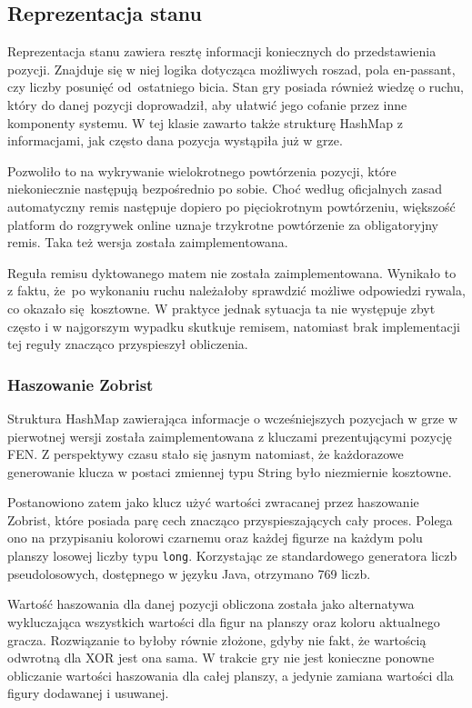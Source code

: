 \subsection{Reprezentacja stanu}
\label{subsec:reprezentacja-stanu}

Reprezentacja stanu zawiera resztę informacji koniecznych do przedstawienia pozycji.
Znajduje się w niej logika dotycząca możliwych roszad, pola en-passant, czy liczby posunięć od~ostatniego bicia.
Stan gry posiada również wiedzę o ruchu, który do danej pozycji doprowadził, aby ułatwić jego cofanie przez inne komponenty systemu.
W tej klasie zawarto także strukturę HashMap z informacjami, jak często dana pozycja wystąpiła już w grze.

Pozwoliło to na wykrywanie wielokrotnego powtórzenia pozycji, które niekoniecznie następują bezpośrednio po sobie.
Choć według oficjalnych zasad automatyczny remis następuje dopiero po pięciokrotnym powtórzeniu, większość platform do rozgrywek online uznaje trzykrotne powtórzenie za obligatoryjny remis.
Taka też wersja została zaimplementowana.

Reguła remisu dyktowanego matem nie została zaimplementowana.
Wynikało to z faktu, że~po wykonaniu ruchu należałoby sprawdzić możliwe odpowiedzi rywala, co okazało się~kosztowne.
W praktyce jednak sytuacja ta nie występuje zbyt często i w najgorszym wypadku skutkuje remisem, natomiast brak implementacji tej reguły znacząco przyspieszył obliczenia.

\subsubsection{Haszowanie Zobrist}
Struktura HashMap zawierająca informacje o wcześniejszych pozycjach w grze w pierwotnej wersji została zaimplementowana z kluczami prezentującymi pozycję FEN.
Z perspektywy czasu stało się jasnym natomiast, że każdorazowe generowanie klucza w postaci zmiennej typu String było niezmiernie kosztowne.

Postanowiono zatem jako klucz użyć wartości zwracanej przez haszowanie Zobrist, które posiada parę cech znacząco przyspieszających cały proces.
Polega ono na przypisaniu kolorowi czarnemu oraz każdej figurze na każdym polu planszy losowej liczby typu \texttt{long}.
Korzystając ze standardowego generatora liczb pseudolosowych, dostępnego w języku Java, otrzymano 769 liczb.

Wartość haszowania dla danej pozycji obliczona została jako alternatywa wykluczająca wszystkich wartości dla figur na planszy oraz koloru aktualnego gracza.
Rozwiązanie to byłoby równie złożone, gdyby nie fakt, że wartością odwrotną dla XOR jest ona sama.
W trakcie gry nie jest konieczne ponowne obliczanie wartości haszowania dla całej planszy, a jedynie zamiana wartości dla figury dodawanej i usuwanej.


